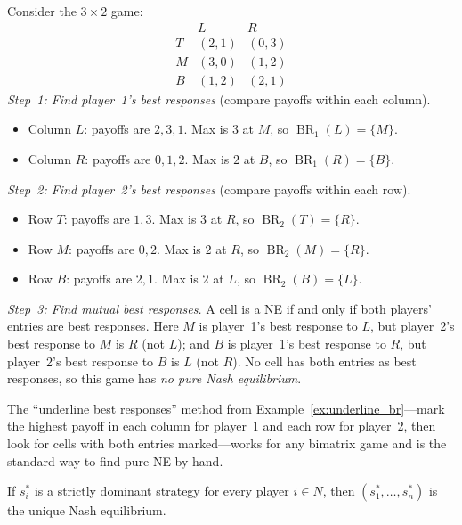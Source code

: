 \documentclass[11pt,a4paper]{article}
\DeclareMathOperator{\BR}{BR}
\begin{document}
\begin{example}
\label{ex:underline_br}
Consider the $3 \times 2$ game:
\[
\begin{array}{c|cc}
    & L & R \\ \hline
  T & (2,1) & (0,3) \\
  M & (3,0) & (1,2) \\
  B & (1,2) & (2,1)
\end{array}
\]
\emph{Step~1: Find player~1's best responses} (compare payoffs within each
column).
\begin{itemize}[nosep]
    \item Column $L$: payoffs are $2, 3, 1$.  Max is $3$ at $M$, so
    $\BR_1(L) = \{M\}$.
    \item Column $R$: payoffs are $0, 1, 2$.  Max is $2$ at $B$, so
    $\BR_1(R) = \{B\}$.
\end{itemize}
\emph{Step~2: Find player~2's best responses} (compare payoffs within each
row).
\begin{itemize}[nosep]
    \item Row $T$: payoffs are $1, 3$.  Max is $3$ at $R$, so
    $\BR_2(T) = \{R\}$.
    \item Row $M$: payoffs are $0, 2$.  Max is $2$ at $R$, so
    $\BR_2(M) = \{R\}$.
    \item Row $B$: payoffs are $2, 1$.  Max is $2$ at $L$, so
    $\BR_2(B) = \{L\}$.
\end{itemize}
\emph{Step~3: Find mutual best responses.}  A cell is a NE if and only if
both players' entries are best responses.  Here $M$ is player~1's best
response to $L$, but player~2's best response to $M$ is $R$ (not $L$);
and $B$ is player~1's best response to $R$, but player~2's best response
to $B$ is $L$ (not $R$).  No cell has both entries as best responses, so
this game has \emph{no pure Nash equilibrium}.
\end{example}

\begin{keyresult}
The ``underline best responses'' method from
Example~\ref{ex:underline_br}---mark the highest payoff in each column for
player~1 and each row for player~2, then look for cells with both entries
marked---works for any bimatrix game and is the standard way to find pure NE
by hand.
\end{keyresult}

\begin{proposition}
\label{prop:dominant_nash}
If $s_i^*$ is a strictly dominant strategy for every player $i \in N$, then
$(s_1^*, \ldots, s_n^*)$ is the unique Nash equilibrium.
\end{proposition}
\end{document}
